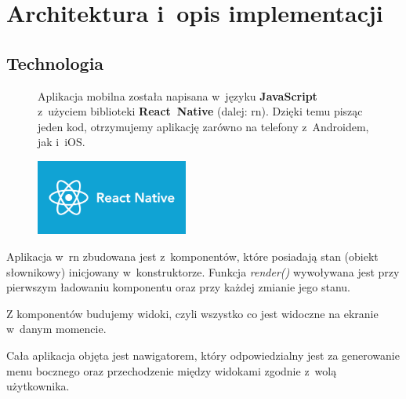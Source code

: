 \section{Architektura i~opis implementacji}

\subsection{Technologia}
\begin{figure}[!htb]
    \centering
    \begin{minipage}{.6\textwidth}
Aplikacja mobilna została napisana w~języku \textbf{JavaScript} z~użyciem biblioteki \textbf{React~Native}\cite{react-native} (dalej: \acrshort{rn}). Dzięki temu pisząc jeden kod, otrzymujemy aplikację zarówno na telefony z~Androidem, jak i~iOS.
    \end{minipage}%
    \begin{minipage}{.4\textwidth}
        \centering
        \includegraphics[width=5cm]{images/ReactNative.png}\label{RN_logo}
    \end{minipage}
\end{figure}

Aplikacja w~\acrshort{rn} zbudowana jest z~komponentów, które posiadają stan (obiekt słownikowy) inicjowany w~konstruktorze. Funkcja \textit{render()} wywoływana jest przy pierwszym ładowaniu komponentu oraz przy każdej zmianie jego stanu. 

Z komponentów budujemy widoki, czyli wszystko co jest widoczne na ekranie w~danym momencie.

Cała aplikacja objęta jest nawigatorem, który odpowiedzialny jest za generowanie menu bocznego oraz przechodzenie między widokami zgodnie z~wolą użytkownika. \\

